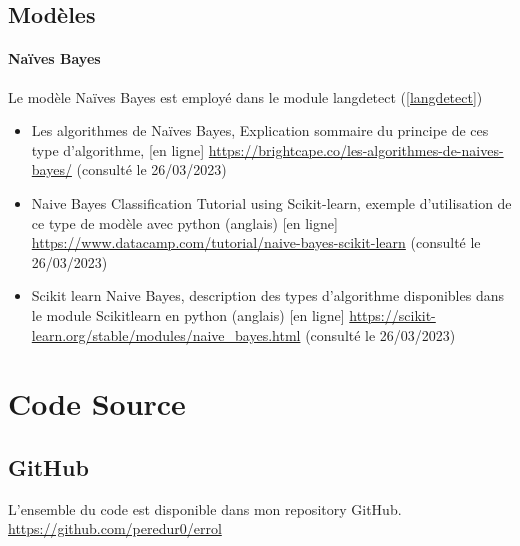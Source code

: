 \documentclass[a4paper,12pt]{article}
\begin{document}
		\subsection{Modèles}
			\paragraph{Naïves Bayes}
				Le modèle Naïves Bayes est employé dans le module langdetect (\ref{langdetect})
				\begin{itemize}
					\item Les algorithmes de Naïves Bayes, Explication sommaire du principe de ces type d'algorithme, [en ligne] \url{https://brightcape.co/les-algorithmes-de-naives-bayes/} (consulté le 26/03/2023)
					\item Naive Bayes Classification Tutorial using Scikit-learn, exemple d'utilisation de ce type de modèle avec python (anglais) [en ligne] \url{https://www.datacamp.com/tutorial/naive-bayes-scikit-learn} (consulté le 26/03/2023)
					\item Scikit learn Naive Bayes, description des types d'algorithme disponibles dans le module Scikitlearn en python (anglais) [en ligne] \url{https://scikit-learn.org/stable/modules/naive_bayes.html} (consulté le 26/03/2023)
				\end{itemize}

	\section{Code Source}
		\subsection{GitHub}
			L'ensemble du code est disponible dans mon repository GitHub. \url{https://github.com/peredur0/errol}
	
\end{document}

